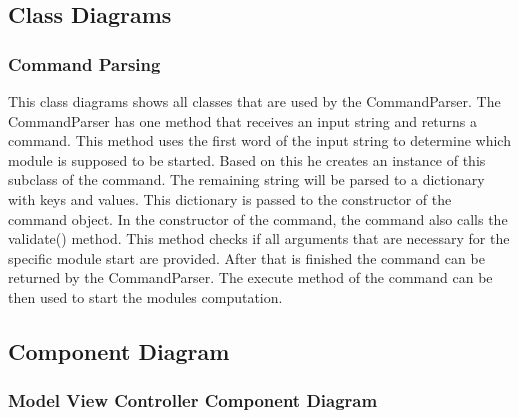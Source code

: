 \documentclass[parskip=full]{scrartcl}
\begin{document}
\newpage

\subsection{Class Diagrams}

\subsubsection{Command Parsing}

\begin{figure}[h]
\begin{center}

\label{Command Parsing}
\end{center}
\end{figure}
\newpage

This class diagrams shows all classes that are used by the CommandParser.
The CommandParser has one method that receives an input string and returns a command.
This method uses the first word of the input string to determine which module is supposed to be started.
Based on this he creates an instance of this subclass of the command.
The remaining string will be parsed to a dictionary with keys and values. 
This dictionary is passed to the constructor of the command object.
In the constructor of the command, the command also calls the validate() method.
This method checks if all arguments that are necessary for the specific module start are provided.
After that is finished the command can be returned by the CommandParser.
The execute method of the command can be then used to start the modules computation.

\newpage

\subsection{Component Diagram}

\subsubsection{Model View Controller Component Diagram}

\begin{figure}[h]
\begin{center}

\label{Model View Controller Component Diagram}
\end{center}
\end{figure}
\newpage
\end{document}
